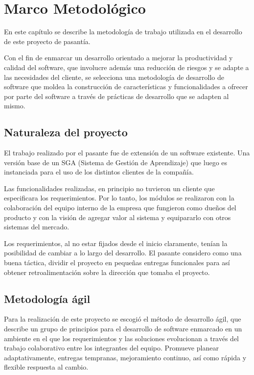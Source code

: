 ﻿\chapter{Marco Metodológico}
\thispagestyle{empty} %

En este capítulo se describe la metodología de trabajo utilizada en el desarrollo de este proyecto de pasantía.

Con el fin de enmarcar un desarrollo orientado a mejorar la productividad y calidad del software, que involucre además una reducción de riesgos y se adapte a las necesidades del cliente, se selecciona una metodología de desarrollo de software que moldea la construcción de características y funcionalidades a ofrecer por parte del software a través de prácticas de desarrollo que se adapten al mismo.

\section{Naturaleza del proyecto}
El trabajo realizado por el pasante fue de extensión de un software existente. Una versión base de un SGA (Sistema de Gestión de Aprendizaje) que luego es instanciada para el uso de los distintos clientes de la compañía. 

Las funcionalidades realizadas, en principio no tuvieron un cliente que especificara los requerimientos. Por lo tanto, los módulos se realizaron con la colaboración del equipo interno de la empresa que fungieron como dueños del producto y con la visión de agregar valor al sistema y equipararlo con otros sistemas del mercado.

Los requerimientos, al no estar fijados desde el inicio claramente, tenían la posibilidad de cambiar a lo largo del desarrollo. El pasante considero como una buena táctica, dividir el proyecto en pequeñas entregas funcionales para así obtener retroalimentación sobre la dirección que tomaba el proyecto.

\section{Metodología ágil}

Para la realización de este proyecto se escogió el método de desarrollo ágil, que describe un grupo de principios para el desarrollo de software enmarcado en un ambiente en el que los requerimientos y las soluciones evolucionan a través del trabajo colaborativo entre los integrantes del equipo. Promueve planear adaptativamente, entregas tempranas, mejoramiento continuo, así como rápida y flexible respuesta al cambio.

